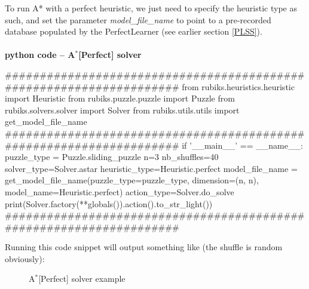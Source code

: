 To run A{*} with a perfect heuristic, we just need to specify the heuristic type as such, and set the parameter \textit{model\_file\_name} to point to a pre-recorded database populated by the PerfectLearner (see earlier section \ref{PLSS}).


\afblue
\paragraph{}{\textbf{python code -- A$^{*}$[Perfect] solver}}
\begin{python}
####################################################################
from rubiks.heuristics.heuristic import Heuristic
from rubiks.puzzle.puzzle import Puzzle
from rubiks.solvers.solver import Solver
from rubiks.utils.utils import get_model_file_name
####################################################################
if '__main__' == __name__:
    puzzle_type = Puzzle.sliding_puzzle
    n=3
    nb_shuffles=40
    solver_type=Solver.astar
    heuristic_type=Heuristic.perfect
    model_file_name = get_model_file_name(puzzle_type=puzzle_type,
                                          dimension=(n, n),
                                          model_name=Heuristic.perfect)
    action_type=Solver.do_solve
    print(Solver.factory(**globals()).action().to_str_light())
####################################################################
\end{python}
\black
Running this code snippet will output something like (the shuffle is random obviously):


\begin{figure}[H]
  \noindent
  \caption[Examples]{A$^{*}$[Perfect] solver example}
  \label{fig:exampleastarperfectsolver}
\end{figure}


